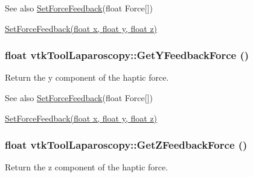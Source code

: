 \begin{DoxySeeAlso}{See also}
\hyperlink{classvtkToolLaparoscopy_a9bbfa040ca224472e6c669a3c27d9977}{SetForceFeedback}(float Force\mbox{[}\mbox{]}) 

\hyperlink{classvtkToolLaparoscopy_aa716d470104640646068eaa160a7adf2}{SetForceFeedback(float x, float y, float z)} 
\end{DoxySeeAlso}
\hypertarget{classvtkToolLaparoscopy_a44acfb672a0526b9628372c19249c41c}{
\subsubsection[{GetYFeedbackForce}]{\setlength{\rightskip}{0pt plus 5cm}float vtkToolLaparoscopy::GetYFeedbackForce ()}}
\label{classvtkToolLaparoscopy_a44acfb672a0526b9628372c19249c41c}


Return the y component of the haptic force. 

\begin{DoxySeeAlso}{See also}
\hyperlink{classvtkToolLaparoscopy_a9bbfa040ca224472e6c669a3c27d9977}{SetForceFeedback}(float Force\mbox{[}\mbox{]}) 

\hyperlink{classvtkToolLaparoscopy_aa716d470104640646068eaa160a7adf2}{SetForceFeedback(float x, float y, float z)} 
\end{DoxySeeAlso}
\hypertarget{classvtkToolLaparoscopy_a2743b59822a1b2b2d8c04f45dca44e32}{
\subsubsection[{GetZFeedbackForce}]{\setlength{\rightskip}{0pt plus 5cm}float vtkToolLaparoscopy::GetZFeedbackForce ()}}
\label{classvtkToolLaparoscopy_a2743b59822a1b2b2d8c04f45dca44e32}


Return the z component of the haptic force. 

